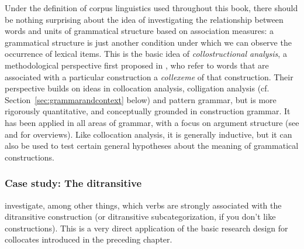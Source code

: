 Under the definition of corpus linguistics used throughout this book, there should be nothing surprising about the idea of investigating the relationship between words and units of grammatical  structure based on association  measures:  a grammatical structure is just another condition under which we can observe the occurrence of lexical items. This is the basic idea of \textit{collostructional  analysis}, a methodological perspective first proposed in \citet{stefanowitsch_collostructions:_2003}, who refer to words that are associated with a particular construction a \textit{collexeme}  of that construction. Their perspective builds on ideas in collocation  analysis, colligation analysis (cf. Section~\ref{sec:grammarandcontext} below) and pattern grammar,  but is more rigorously quantitative,  and conceptually grounded in construction grammar.  It has been applied in all areas of grammar, with a focus on argument structure (see \citet{ludeling_corpora_2009} and \citet{hoffmann_collostructional_2013} for overviews). Like collocation  analysis, it is generally inductive,  but it can also be used to test certain general hypotheses about the meaning  of grammatical  constructions.

\subsubsection{Case study: The ditransitive}
\label{sec:theditransitive}

\citet{stefanowitsch_collostructions:_2003} investigate, among other things, which verbs  are strongly associated  with the ditransitive  construction (or ditransitive subcategorization,  if you don't like constructions). This is a very direct application of the basic research design  for collocates  introduced in the preceding chapter.

